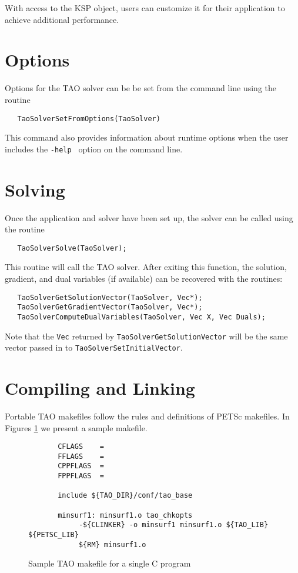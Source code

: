 \noindent
With access to the KSP object, users can customize it for their application
to achieve additional performance.


\section{Options}
Options for the TAO solver 
can be be set from the command line using the routine  
\begin{verbatim}
   TaoSolverSetFromOptions(TaoSolver)
\end{verbatim}
This command also provides information about runtime options when the
user includes the {\tt -help } option on the
command line.

\section{Solving}
Once the application and solver have been set up, the solver can be called using the routine
\begin{verbatim}
   TaoSolverSolve(TaoSolver);
\end{verbatim}
\noindent
This  routine will call the TAO solver. 
After exiting this function, the solution, gradient, and dual variables (if
available) can be
recovered with the routines:
\begin{verbatim}
   TaoSolverGetSolutionVector(TaoSolver, Vec*);
   TaoSolverGetGradientVector(TaoSolver, Vec*);
   TaoSolverComputeDualVariables(TaoSolver, Vec X, Vec Duals);
\end{verbatim}
\noindent
Note that the {\tt Vec} returned by {\tt TaoSolverGetSolutionVector} will be
the same vector passed in to {\tt TaoSolverSetInitialVector}.



\section{Compiling and Linking}

Portable TAO makefiles follow the rules and definitions
of PETSc makefiles.
In Figures \ref{fig:make3} we present a sample makefile.

\begin{figure}[tbh]
{\footnotesize
\begin{verbatim}   
       CFLAGS    = 
       FFLAGS    = 
       CPPFLAGS  =
       FPPFLAGS  =
       
       include ${TAO_DIR}/conf/tao_base
   
       minsurf1: minsurf1.o tao_chkopts
            -${CLINKER} -o minsurf1 minsurf1.o ${TAO_LIB} ${PETSC_LIB}
            ${RM} minsurf1.o
\end{verbatim} 
\noindent
}
\caption{Sample TAO makefile for a single C program}
\label{fig:make3}
\end{figure}

